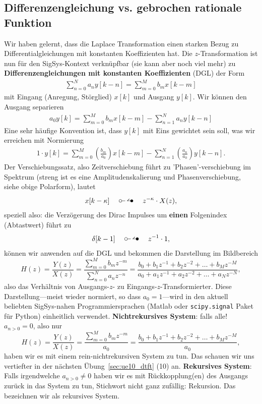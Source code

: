 \subsection*{Differenzengleichung vs. gebrochen rationale Funktion}
Wir haben gelernt, dass die Laplace Transformation einen starken Bezug zu
Differentialgleichungen mit konstanten Koeffizienten hat.
%
Die $z$-Transformation ist nun für den SigSys-Kontext verknüpfbar
(sie kann aber noch viel mehr) zu
\textbf{Differenzengleichungen mit konstanten Koeffizienten} (DGL) der Form
\begin{align}
\sum_{n=0}^N a_n y[k-n] = \sum_{m=0}^M b_m x[k-m]
\end{align}
mit Eingang (Anregung, Störglied) $x[k]$ und Ausgang $y[k]$.
%
Wir können den Ausgang separieren
\begin{align}
a_0 y[k] = \sum_{m=0}^M b_m x[k-m] - \sum_{n=1}^N a_n y[k-n]
\end{align}
%
Eine sehr häufige Konvention ist, dass $y[k]$ mit Eins gewichtet sein soll, was wir erreichen mit
Normierung
\begin{align}
1 \cdot y[k] = \sum_{m=0}^M \left(\frac{b_m}{a_0}\right) x[k-m] - \sum_{n=1}^N \left(\frac{a_n}{a_0}\right) y[k-n].
\end{align}
%
Der Verschiebungssatz, also Zeitverschiebung führt zu
'Phasen'-verschiebung im Spektrum (streng ist es eine Amplitudenskalierung und Phasenverschiebung, siehe obige Polarform), lautet
\begin{align}
x[k-\kappa] \quad\ztransf\quad z^{-\kappa} \cdot X(z),
\end{align}
speziell also: die Verzögerung des Dirac Impulses um \textbf{einen} Folgenindex (Abtastwert)
führt zu
\begin{align}
\delta[k-1] \quad\ztransf\quad z^{-1} \cdot 1,
\end{align}
können wir anwenden auf die DGL und bekommen die Darstellung im Bildbereich
\begin{equation}
H(z) = \frac{Y(z)}{X(z)} =
\frac{\sum\limits_{m=0}^{M} b_m z^{-m}}{\sum\limits_{n=0}^{N} a_n z^{-n}}=
\frac{b_0 + b_1 z^{-1} + b_2 z^{-2} + \dots + b_M z^{-M}}{a_0 + a_1 z^{-1} + a_2 z^{-2} + \dots + a_N z^{-N}},
\end{equation}
also das Verhältnis von Ausgangs-$z$- zu Eingangs-$z$-Transformierter.
Diese Darstellung---meist wieder normiert, so dass $a_0=1$---wird in
den aktuell beliebten SigSys-nahen Programmiersprachen (Matlab
oder \texttt{scipy.signal} Paket für Python) einheitlich verwendet.
\textbf{Nichtrekursives System}: falls alle! $a_{n>0} = 0$, also nur
\begin{equation}
H(z) = \frac{Y(z)}{X(z)} =
\frac{\sum\limits_{m=0}^{M} b_m z^{-m}}{a_0}=
\frac{b_0 + b_1 z^{-1} + b_2 z^{-2} + \dots + b_M z^{-M}}{a_0},
\end{equation}
haben wir es mit einem rein-nichtrekursiven System zu tun. Das schauen wir uns
vertiefter in der nächsten Übung~\ref{sec:ue10_dtft} (10) an.
%
\textbf{Rekursives System}: Falls irgendwelche
$a_{n>0} \neq 0$ haben wir es mit Rückkopplung(en) des Ausgangs zurück in das System zu tun,
Stichwort nicht ganz zufällig: Rekursion. Das bezeichnen wir als rekursives System.


